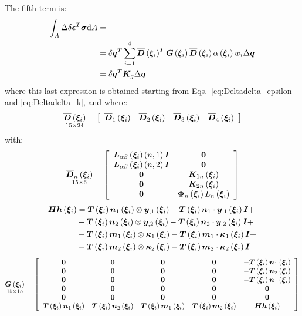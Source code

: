 The fifth term is:
\begin{equation}
\begin{split}
\int_A \Delta \delta { \T{\epsilon} }^T \T{\sigma} \text{d}A & = \\
& = \delta{\T{q}}^T  \sum_{i=1}^{4} \overline{\TT{D}}\valxii^T  \TT{G}\valxii  \overline{\TT{D}}\valxii  \alpha \valxii  w_i \Delta \T{q} \\
& = \delta{\T{q}}^T  \TT{K}_g  \Delta \T{q}
\end{split}
\end{equation}
where this last expression is obtained starting from Eqs.~\ref{eq:Deltadelta_epsilon} and \ref{eq:Deltadelta_k}, and where:
\begin{equation}
\underset{ 15 \times 24 }{\overline{\TT{D}} \valxii} =
\sqbr{ \matr{ c c c c  }{
\overline{\TT{D}}_1 \valxii & \overline{\TT{D}}_2 \valxii & \overline{\TT{D}}_3 \valxii & \overline{\TT{D}}_4 \valxii
}}
\end{equation}
with:
\begin{equation}
\underset{ 15 \times 6 }{\overline{\TT{D}}_n \valxii} =
\sqbr{ \matr{ c c  }{
\TT{L}_{\alpha \beta} \valxii \plbr{n,1} \T{I} & \T{0} \\
\TT{L}_{\alpha \beta} \valxii \plbr{n,2} \T{I} & \T{0} \\
\T{0} & \TT{K}_{1n} \valxii\\
\T{0} & \TT{K}_{2n} \valxii \\
\T{0} & \TT{\Phi}_{n} \valxii L_{n} \valxii \\
}}
\end{equation}
\begin{equation}
\begin{split}
\TT{Hh} \valxii & =
\TT{T} \valxii \T{n}_1 \valxii \otimes \T{y}_{,1} \valxii - \TT{T} \valxii \T{n}_1 \cdot \T{y}_{,1} \valxii \T{I} + \\
& + \TT{T} \valxii \T{n}_2 \valxii \otimes \T{y}_{,2} \valxii - \TT{T} \valxii \T{n}_2 \cdot \T{y}_{,2} \valxii \T{I} + \\
& + \TT{T} \valxii \T{m}_1 \valxii \otimes \T{\kappa}_{1} \valxii - \TT{T} \valxii \T{m}_1 \cdot \T{\kappa}_{1} \valxii \T{I} + \\
& + \TT{T} \valxii \T{m}_2 \valxii \otimes \T{\kappa}_{2} \valxii - \TT{T} \valxii \T{m}_2 \cdot \T{\kappa}_{2} \valxii \T{I}
\end{split}
\end{equation}
\begin{equation}
\underset{ 15 \times 15 }{ \TT{G} \valxii } =
\sqbr{ \matr{ c c c c c}{
\T{0} & \T{0} & \T{0} & \T{0} & -\TT{T} \valxii \T{n}_1 \valxii \\
\T{0} & \T{0} & \T{0} & \T{0} & -\TT{T} \valxii \T{n}_2 \valxii \\
\T{0} & \T{0} & \T{0} & \T{0} & -\TT{T} \valxii \T{n}_1 \valxii \\
\T{0} & \T{0} & \T{0} & \T{0} &  \T{0} \\
\T{0} & \T{0} & \T{0} & \T{0} &  \T{0} \\
\TT{T} \valxii \T{n}_1 \valxii & \TT{T} \valxii \T{n}_2 \valxii & \TT{T} \valxii \T{m}_1 \valxii &  \TT{T} \valxii \T{m}_2 \valxii & \TT{Hh} \valxii
}}
\end{equation}
